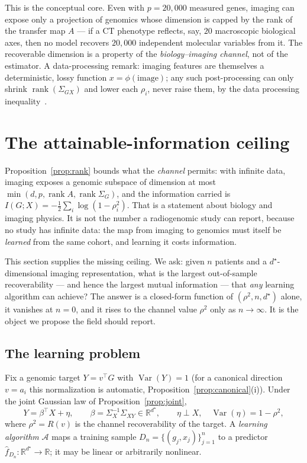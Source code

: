 \documentclass{article}
\newcommand{\R}{\mathbb{R}}
\newcommand{\Var}{\operatorname{Var}}
\newcommand{\rank}{\operatorname{rank}}
\newcommand{\Sg}{\Sigma_{G}}
\newcommand{\Sx}{\Sigma_{X}}
\newcommand{\Sgx}{\Sigma_{GX}}
\newcommand{\T}{^{\top}}
\begin{document}
This is the conceptual core. Even with $p = 20{,}000$ measured genes, imaging can
expose only a projection of genomics whose dimension is capped by the rank of the
transfer map $A$ --- if a CT phenotype reflects, say, $20$ macroscopic
biological axes, then no model recovers $20{,}000$ independent molecular
variables from it. The recoverable dimension is a property of the
\emph{biology--imaging channel}, not of the estimator. A data-processing remark:
imaging features are themselves a deterministic, lossy function
$x = \phi(\text{image})$; any such post-processing can only shrink
$\rank(\Sgx)$ and lower each $\rho_i$, never raise them, by the data
processing inequality~\citep{cover2006elements,tishby2015deep,saxe2019ib,achille2018infodropout,kolchinsky2019nonlinearib}.

\section{The attainable-information ceiling}
\label{sec:attainable}

Proposition~\ref{prop:rank} bounds what the \emph{channel} permits: with
infinite data, imaging exposes a genomic subspace of dimension at most
$\min(d,p,\rank A,\rank\Sg)$, and the information carried is
$I(G;X)=-\tfrac12\sum_i\log(1-\rho_i^2)$. That is a statement about biology and
imaging physics. It is not the number a radiogenomic study can report, because
no study has infinite data: the map from imaging to genomics must itself be
\emph{learned} from the same cohort, and learning it costs information.

This section supplies the missing ceiling. We ask: given $n$ patients and a
$d^\star$-dimensional imaging representation, what is the largest out-of-sample
recoverability --- and hence the largest mutual information --- that
\emph{any} learning algorithm can achieve? The answer is a closed-form function
of $(\rho^2, n, d^\star)$ alone, it vanishes at $n=0$, and it rises to the
channel value $\rho^2$ only as $n\to\infty$. It is the object we propose the
field should report.

\subsection{The learning problem}
\label{sec:attainable-setup}

Fix a genomic target $Y=v\T G$ with $\Var(Y)=1$ (for a canonical direction
$v=a_i$ this normalization is automatic, Proposition~\ref{prop:canonical}(i)).
Under the joint Gaussian law of Proposition~\ref{prop:joint},
\begin{equation}
Y = \beta\T X + \eta,\qquad
\beta = \Sx^{-1}\Sigma_{XY}\in\R^{d^\star},\qquad
\eta\perp X,\quad \Var(\eta) = 1-\rho^2,
\label{eq:att-regression}
\end{equation}
where $\rho^2=R(v)$ is the channel recoverability of the target. A
\emph{learning algorithm} $\mathcal{A}$ maps a training sample
$D_n=\{(g_j,x_j)\}_{j=1}^n$ to a predictor
$\hat f_{D_n}:\R^{d^\star}\to\R$; it may be linear or arbitrarily nonlinear.
\end{document}

